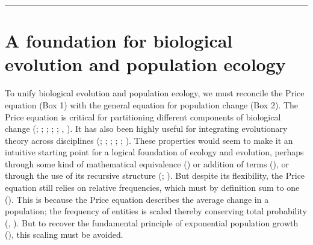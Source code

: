 \documentclass[
]{article}
\begin{document}
\begin{center}\rule{0.5\linewidth}{0.5pt}\end{center}

\section{A foundation for biological evolution and population
ecology}\label{a-foundation-for-biological-evolution-and-population-ecology}

To unify biological evolution and population ecology, we must reconcile
the Price equation (Box 1) with the general equation for population
change (Box 2). The Price equation is critical for partitioning
different components of biological change
(; ; ;
; ; ,
). It has also been highly useful for
integrating evolutionary theory across disciplines
(;
;
;
; ; ). These
properties would seem to make it an intuitive starting point for a
logical foundation of ecology and evolution, perhaps through some kind
of mathematical equivalence () or addition of terms (), or through the use of its recursive structure
(;
). But despite its flexibility, the
Price equation still relies on relative frequencies, which must by
definition sum to one (). This is
because the Price equation describes the average change in a population;
the frequency of entities is scaled thereby conserving total probability
(, ).
But to recover the fundamental principle of exponential population
growth (), this scaling must be
avoided.
\end{document}
